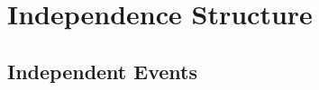 \documentclass[6008notes.tex]{subfiles}
\begin{document}
\graphicspath{ {images/indepstruct/} }

\section{Independence Structure}

\subsection{Independent Events}
\end{document}
